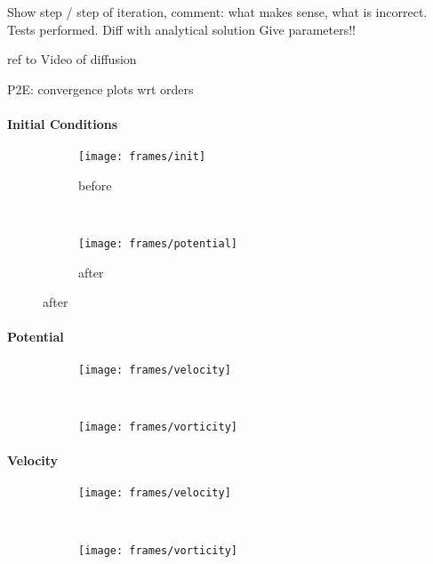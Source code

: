 \documentclass[a4paper,12pt,twoside]{article}
\begin{document}
Show step / step of iteration, comment: what makes sense, what is incorrect. Tests performed. Diff with analytical solution 
Give parameters!!

ref to Video of diffusion 

P2E: convergence plots wrt orders


\paragraph{Initial Conditions}

\begin{figure}[h]
	\centering
	\begin{subfigure}[b]{0.48\textwidth}
		\texttt{[image: frames/init]}
		\caption{before}
		\end{subfigure}
		~
		\begin{subfigure}[b]{0.48\textwidth}
			\texttt{[image: frames/potential]}
			\caption{after}
		\end{subfigure}
\end{figure}

\paragraph{Potential}

\begin{figure}
	\begin{subfigure}[b]{0.48\textwidth}
		\texttt{[image: frames/velocity]}
	\end{subfigure}
	~
	\begin{subfigure}[b]{0.48\textwidth}
		\texttt{[image: frames/vorticity]}
	\end{subfigure}
\end{figure}

\paragraph{Velocity}

\begin{figure}
	\begin{subfigure}[b]{0.48\textwidth}
		\texttt{[image: frames/velocity]}
	\end{subfigure}
	~
	\begin{subfigure}[b]{0.48\textwidth}
		\texttt{[image: frames/vorticity]}
	\end{subfigure}
\end{figure}
\end{document}
